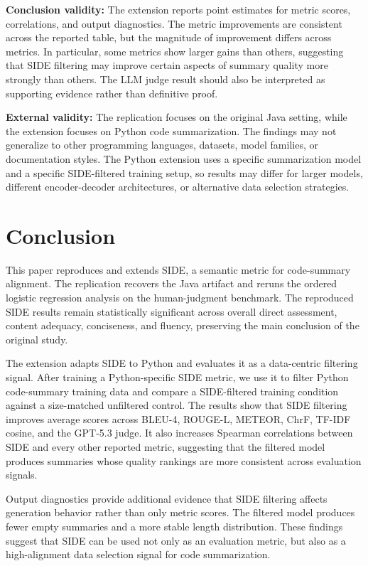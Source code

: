 \documentclass[conference]{IEEEtran}
\begin{document}
\textbf{Conclusion validity:} The extension reports point estimates for metric scores, correlations, and output diagnostics. The metric improvements are consistent across the reported table, but the magnitude of improvement differs across metrics. In particular, some metrics show larger gains than others, suggesting that SIDE filtering may improve certain aspects of summary quality more strongly than others. The LLM judge result should also be interpreted as supporting evidence rather than definitive proof.

\textbf{External validity:} The replication focuses on the original Java setting, while the extension focuses on Python code summarization. The findings may not generalize to other programming languages, datasets, model families, or documentation styles. The Python extension uses a specific summarization model and a specific SIDE-filtered training setup, so results may differ for larger models, different encoder-decoder architectures, or alternative data selection strategies.

\section{Conclusion}

This paper reproduces and extends SIDE, a semantic metric for code-summary alignment. The replication recovers the Java artifact and reruns the ordered logistic regression analysis on the human-judgment benchmark. The reproduced SIDE results remain statistically significant across overall direct assessment, content adequacy, conciseness, and fluency, preserving the main conclusion of the original study.

The extension adapts SIDE to Python and evaluates it as a data-centric filtering signal. After training a Python-specific SIDE metric, we use it to filter Python code-summary training data and compare a SIDE-filtered training condition against a size-matched unfiltered control. The results show that SIDE filtering improves average scores across BLEU-4, ROUGE-L, METEOR, ChrF, TF-IDF cosine, and the GPT-5.3 judge. It also increases Spearman correlations between SIDE and every other reported metric, suggesting that the filtered model produces summaries whose quality rankings are more consistent across evaluation signals.

Output diagnostics provide additional evidence that SIDE filtering affects generation behavior rather than only metric scores. The filtered model produces fewer empty summaries and a more stable length distribution. These findings suggest that SIDE can be used not only as an evaluation metric, but also as a high-alignment data selection signal for code summarization.
\newpage
\balance


\end{document}
